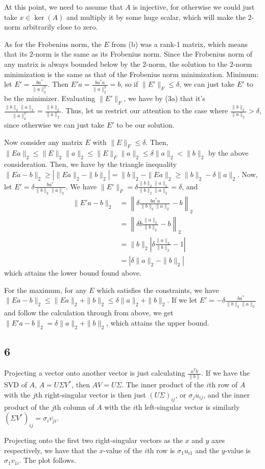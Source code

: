 \documentclass{article}
\newcommand{\conj}{\overline}
\begin{document}
At this point, we need to assume that $A$ is injective, for otherwise we could just take $x\in\ker(A)$ and multiply it by some huge scalar, which will make the $2$-norm arbitrarily close to zero. 

As for the Frobenius norm, the $E$ from (b) was a rank-1 matrix, which means that its $2$-norm is the same as its Frobenius norm. Since the Frobenius norm of any matrix is always bounded below by the $2$-norm, the solution to the $2$-norm minimization is the same as that of the Frobenius norm minimization.
Minimum: let $E'=\frac{ba^*}{\|a\|_2^2}$. Then $E'a=\frac{ba^*a}{\|a\|_2^2}=b$, so if $\|E'\|_F\leq\delta$, we can just take $E'$ to be the minimizer. Evaluating $\|E'\|_F$, we have by (3a) that it's $\frac{\|b\|_2\|a\|_2}{\|a\|_2^2}=\frac{\|b\|_2}{\|a\|_2}$. Thus, let us restrict our attention to the case where $\frac{\|b\|_2}{\|a\|_2}>\delta$, since otherwise we can just take $E'$ to be our solution.

Now consider any matrix $E$ with $\|E\|_F\leq\delta$. Then, $\|Ea\|_2\leq\|E\|_2\|a\|_2\leq\|E\|_F\|a\|_2\leq\delta\|a\|_2<\|b\|_2$ by the above consideration. Then, we have by the triangle inequality $\|Ea-b\|_2\geq\left|\|Ea\|_2-\|b\|_2\right|=\|b\|_2-\|Ea\|_2\geq\|b\|_2-\delta\|a\|_2$. Now, let $E'=\delta\frac{ba^*}{\|b\|_2\|a\|_2}$. We have $\|E'\|_F=\delta\frac{\|b\|_2\|a\|_2}{\|b\|_2\|a\|_2}=\delta$, and
\begin{align*}
    \|E'a-b\|_2&=\left\|\delta\frac{ba^*a}{\|b\|_2\|a\|_2}-b\right\|_2\\
              &=\left\|\delta b\frac{\|a\|_2}{\|b\|_2}-b\right\|_2\\
              &=\|b\|_2\left|\delta\frac{\|a\|_2}{\|b\|_2}-1\right|\\
              &=\left|\delta\|a\|_2-\|b\|_2\right|
\end{align*}
which attains the lower bound found above.

For the maximum, for any $E$ which satisfies the constraints, we have $\|Ea-b\|_2\leq\|Ea\|_2+\|b\|_2\leq\delta\|a\|_2+\|b\|_2$. If we let $E'=-\delta\frac{ba^*}{\|b\|_2\|a\|_2}$ and follow the calculation through from above, we get $\|E'a-b\|_2=\delta\|a\|_2+\|b\|_2$, which attains the upper bound.
\subsection*{6}
Projecting a vector onto another vector is just calculating $\frac{a^Tb}{\|b\|}$. If we have the SVD of $A$, $A=U\Sigma V^*$, then $AV=U\Sigma$. The inner product of the $i$th row of $A$ with the $j$th right-singular vector is then just $(U\Sigma)_{ij}$, or $\sigma_ju_{ij}$, and the inner product of the $j$th column of $A$ with the $i$th left-singular vector is similarly $(\Sigma V^*)_{ij}=\sigma_i \conj{v_{ji}}$. 

Projecting onto the first two right-singular vectors as the $x$ and $y$ axes respectively, we have that the $x$-value of the $i$th row is $\sigma_1u_{i1}$ and the $y$-value is $\sigma_1v_{1i}$. The plot follows.
\end{document}
